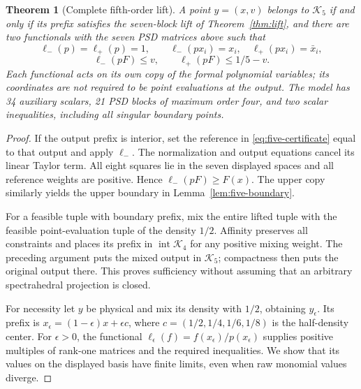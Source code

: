 \documentclass[pdflatex,sn-mathphys-num]{sn-jnl}
\theoremstyle{thmstyleone}
\newtheorem{theorem}{Theorem}
\theoremstyle{thmstyletwo}\newtheorem{remark}[theorem]{Remark}
\newcommand{\K}{\mathcal K}
\begin{document}
\begin{theorem}[Complete fifth-order lift]\label{thm:five-lift}
A point $y=(x,v)$ belongs to $\K_5$ if and only if its prefix satisfies the
seven-block lift of Theorem~\ref{thm:lift}, and there are two functionals
with the seven PSD matrices above such that
\[
 \ell_-(p)=\ell_+(p)=1,\qquad
 \ell_-(px_i)=x_i,\quad\ell_+(px_i)=\bar x_i,
\]
\[
 \ell_-(pF)\le v,\qquad \ell_+(pF)\le1/5-v.
\]
Each functional acts on its own copy of the formal polynomial variables;
its coordinates are not required to be point evaluations at the output.
The model has 34 auxiliary scalars, 21 PSD blocks of maximum order four,
and two scalar inequalities, including all singular boundary points.
\end{theorem}
\begin{proof}
If the output prefix is interior, set the reference in
\eqref{eq:five-certificate} equal to that output and apply $\ell_-$. The
normalization and output equations cancel its linear Taylor term. All eight
squares lie in the seven displayed spaces and all reference weights are
positive. Hence $\ell_-(pF)\ge F(x)$. The upper copy similarly yields the
upper boundary in Lemma~\ref{lem:five-boundary}.

For a feasible tuple with boundary prefix, mix the entire lifted tuple with
the feasible point-evaluation tuple of the density $1/2$. Affinity preserves
all constraints and places its prefix in $\operatorname{int}\K_4$ for any
positive mixing weight. The preceding argument puts the mixed output in
$\K_5$; compactness then puts the original output there. This proves
sufficiency without assuming that an arbitrary spectrahedral projection is closed.

For necessity let $y$ be physical and mix its density with $1/2$, obtaining
$y_\epsilon$. Its prefix is $x_\epsilon=(1-\epsilon)x+\epsilon c$, where
$c=(1/2,1/4,1/6,1/8)$ is the half-density center. For $\epsilon>0$, the functional
$\ell_\epsilon(f)=f(x_\epsilon)/p(x_\epsilon)$ supplies positive multiples
of rank-one matrices and the required inequalities. We show that its values
on the displayed basis have finite limits, even when raw monomial values diverge.


\end{proof}
\end{document}
